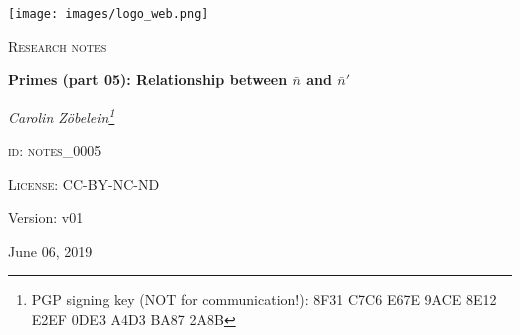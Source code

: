 

\begin{titlepage}
	\begin{center}
    \begin{center}
            \texttt{[image: images/logo\_web.png]}
    \end{center}
    \vspace{1cm}
	{\scshape\Large Research notes\par}
	\vspace{1.5cm}
	{\huge\bfseries Primes (part 05): Relationship between $\bar{n}$ and $\bar{n}\prime$\par}
	\vspace{2cm}
	{\Large\itshape Carolin Z\"obelein\footnote{PGP signing key (NOT for communication!): 8F31 C7C6 E67E 9ACE 8E12 E2EF 0DE3 A4D3 BA87 2A8B}\par}
	\vfill
	\textsc{id: notes\_0005}\par
	\textsc{License: CC-BY-NC-ND}
	\vfill


	\vfill

	{\large Version: v01\par}
	{\large June 06, 2019\par}
	\end{center}
\end{titlepage}

